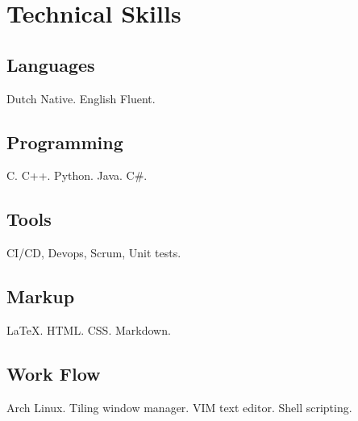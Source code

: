 \section{Technical Ski\textcolor{mycolor}{lls}}
  \subsection{Languages} 
  Dutch \textcolor{mycolor}{Native}. English \textcolor{mycolor}{Fluent}.
  \subsection{Programming}
    C. C++. Python. Java. C\#.
  \subsection{Tools}
    CI/CD, Devops, Scrum, Unit tests.
  \subsection{Markup}
    {\LaTeX}. HTML. CSS. Markdown.
  \subsection{Work Flow}
    Arch Linux. Tiling window manager. VIM text editor. Shell scripting.